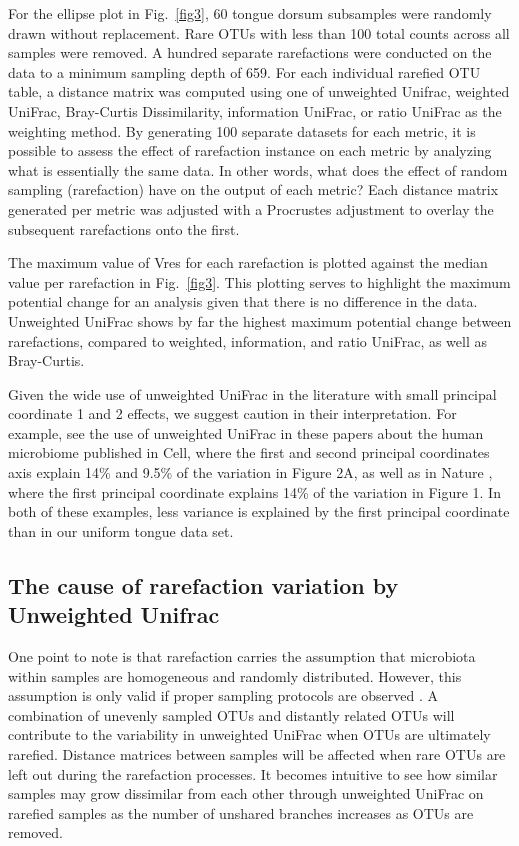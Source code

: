 \documentclass[10pt,letterpaper]{article}
\begin{document}
For the ellipse plot in Fig.~\ref{fig3}, 60 tongue dorsum subsamples were randomly drawn without replacement. Rare OTUs with less than 100 total counts across all samples were removed. A hundred separate rarefactions were conducted on the data to a minimum sampling depth of 659. For each individual rarefied OTU table, a distance matrix was computed using one of unweighted Unifrac, weighted UniFrac, Bray-Curtis Dissimilarity, information UniFrac, or ratio UniFrac as the weighting method. By generating 100 separate datasets for each metric, it is possible to assess the effect of rarefaction instance on each metric by analyzing what is essentially the same data. In other words, what does the effect of random sampling (rarefaction) have on the output of each metric? Each distance matrix generated per metric was adjusted with a Procrustes adjustment to overlay the subsequent rarefactions onto the first.

The maximum value of Vres for each rarefaction is plotted against the median value per rarefaction in Fig.~\ref{fig3}. This plotting serves to highlight the maximum potential change for an analysis given that there is no difference in the data. Unweighted UniFrac shows by far the highest maximum potential change between rarefactions, compared to weighted, information, and ratio UniFrac, as well as Bray-Curtis.

Given the wide use of unweighted UniFrac in the literature with small principal coordinate 1 and 2 effects, we suggest caution in their interpretation. For example, see the use of unweighted UniFrac in these papers about the human microbiome published in Cell\cite{hsiao2013microbiota}, where the first and second principal coordinates axis explain 14\% and 9.5\% of the variation in Figure 2A, as well as in Nature \cite{sonnenburg2016diet}, where the first principal coordinate explains 14\% of the variation in Figure 1. In both of these examples, less variance is explained by the first principal coordinate than in our uniform tongue data set.

\FloatBarrier

\subsection{The cause of rarefaction variation by Unweighted Unifrac}
One point to note is that rarefaction carries the assumption that microbiota within samples are homogeneous and randomly distributed. However, this assumption is only valid if proper sampling protocols are observed \cite{gorzelak2015methods}. A combination of unevenly sampled OTUs and distantly related OTUs will contribute to the variability in unweighted UniFrac when OTUs are ultimately rarefied. Distance matrices between samples will be affected when rare OTUs are left out during the rarefaction processes. It becomes intuitive to see how similar samples may grow dissimilar from each other through unweighted UniFrac on rarefied samples as the number of unshared branches increases as OTUs are removed.
\end{document}

